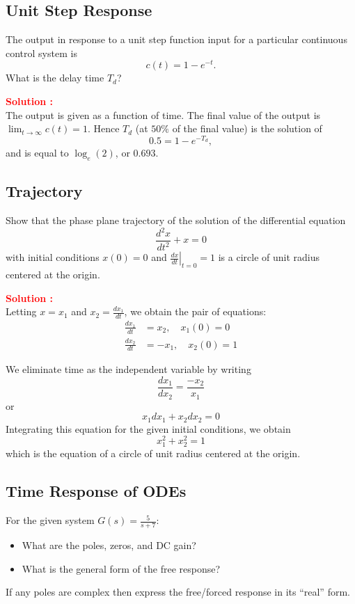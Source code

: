 \documentclass[12pt]{article}
\begin{document}
\clearpage
\subsection{Unit Step Response}

The output in response to a unit step function input for a particular continuous control system is 
\[ c(t) = 1 - e^{-t}. \]
What is the delay time \(T_d\)?

\textbf{\textcolor{red}{Solution :}} \\
The output is given as a function of time. The final value of the output is \(\lim_{t \to \infty} c(t) = 1\). Hence \(T_d\) (at \(50\%\) of the final value) is the solution of 
\[ 0.5 = 1 - e^{-T_d}, \] 
and is equal to \(\log_e(2)\), or \(0.693\).

\clearpage
\subsection{Trajectory}

Show that the phase plane trajectory of the solution of the differential equation
\[ \frac{d^2x}{dt^2} + x = 0 \]
with initial conditions \(x(0) = 0\) and \(\left.\frac{dx}{dt}\right|_{t=0} = 1\) is a circle of unit radius centered at the origin.

\textbf{\textcolor{red}{Solution :}} \\
Letting \(x = x_1\) and \(x_2 = \frac{dx_1}{dt}\), we obtain the pair of equations:
\begin{align*}
\frac{dx_1}{dt} &= x_2, \quad x_1(0) = 0 \\
\frac{dx_2}{dt} &= -x_1, \quad x_2(0) = 1
\end{align*}

We eliminate time as the independent variable by writing
\[ \frac{dx_1}{dx_2} = \frac{-x_2}{x_1} \]
or
\[ x_1 dx_1 + x_2 dx_2 = 0 \]
Integrating this equation for the given initial conditions, we obtain
\[ x_1^2 + x_2^2 = 1 \]
which is the equation of a circle of unit radius centered at the origin.

\clearpage
\subsection{Time Response of ODEs}

For the given system \(G(s) = \frac{5}{s+7}\):
\begin{itemize}
    \item  What are the poles, zeros, and DC gain?
    \item  What is the general form of the free response?
\end{itemize}
If any poles are complex then express the free/forced response in its “real” form.
\end{document}
